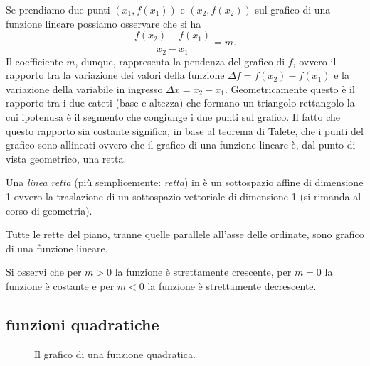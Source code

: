 Se prendiamo due punti $(x_1,f(x_1))$
e $(x_2,f(x_2))$ sul grafico di una funzione lineare
possiamo osservare che si ha
\[
  \frac{f(x_2) - f(x_1)}{x_2 - x_1} = m.
\]
Il coefficiente $m$, dunque, rappresenta la pendenza del
grafico di $f$, ovvero il rapporto tra la variazione
dei valori della funzione $\Delta f = f(x_2) - f(x_1)$
e la variazione della variabile in ingresso
$\Delta x = x_2 - x_1$.
Geometricamente questo è il rapporto tra i due cateti
(base e altezza) che formano un triangolo rettangolo la
cui ipotenusa è il segmento che congiunge i due punti sul grafico.
Il fatto che questo rapporto sia costante significa,
in base al teorema di Talete, che i punti del grafico sono
allineati ovvero che il grafico di una funzione lineare è,
dal punto di vista geometrico, una retta.

\begin{definition}[retta]
  Una \emph{linea retta} (più semplicemente: \emph{retta}) in è un sottospazio affine di dimensione 1 
  ovvero la traslazione di un sottospazio vettoriale di dimensione 1
  (si rimanda al corso di geometria).
\end{definition}

Tutte le rette del piano, 
tranne quelle parallele all'asse delle ordinate,
sono grafico di una funzione lineare.

Si osservi che per $m>0$ la funzione è strettamente crescente,
per $m=0$ la funzione è costante e per $m<0$ la funzione è
strettamente decrescente.

\subsection{funzioni quadratiche}
\label{sec:funzioni_quadratiche}

\begin{figure}
  \begin{center}
  \end{center}
  \caption{Il grafico di una funzione quadratica.}
  \label{fig:funzione_quadratica}
\end{figure}

